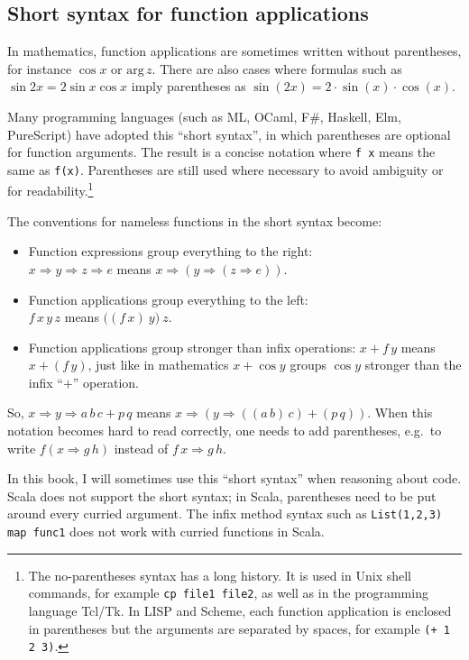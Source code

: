 \subsection{Short syntax for function applications}

In mathematics, function applications are sometimes written without
parentheses, for instance $\cos x$ or $\text{arg}\,z$. There are
also cases where formulas such as $\sin2x=2\sin x\cos x$ imply parentheses
as $\sin\left(2x\right)=2\cdot\sin\left(x\right)\cdot\cos\left(x\right)$.

Many programming languages (such as ML, OCaml, F\#, Haskell, Elm,
PureScript) have adopted this ``short syntax'', in which parentheses
are optional for function arguments. The result is a concise notation
where \lstinline!f x! means the same as \lstinline!f(x)!. Parentheses
are still used where necessary to avoid ambiguity or for readability.\footnote{The no-parentheses syntax has a long history. It is used in Unix shell
commands, for example \lstinline!cp file1 file2!, as well as in the
programming language Tcl/Tk. In LISP and Scheme, each function application
is enclosed in parentheses but the arguments are separated by spaces,
for example \lstinline!(+ 1 2 3)!.}

The conventions for nameless functions in the short syntax become:
\begin{itemize}
\item Function expressions group everything to the right:\\
 $x\Rightarrow y\Rightarrow z\Rightarrow e$ means $x\Rightarrow\left(y\Rightarrow\left(z\Rightarrow e\right)\right)$.
\item Function applications group everything to the left:\\
 $f\,x\,y\,z$ means $\big((f\,x)\:y\big)\:z$. 
\item Function applications group stronger than infix operations: $x+f\,y$
means $x+(f\,y)$, just like in mathematics $x+\cos y$ groups $\cos y$
stronger than the infix ``$+$'' operation.
\end{itemize}
So, $x\Rightarrow y\Rightarrow a\,b\,c+p\,q$ means $x\Rightarrow\left(y\Rightarrow\left(\left(a\,b\right)\,c\right)+(p\,q)\right)$.
When this notation becomes hard to read correctly, one needs to add
parentheses, e.g.\ to write $f(x\Rightarrow g\,h)$ instead of $f\,x\Rightarrow g\,h$.

In this book, I will sometimes use this ``short syntax'' when reasoning
about code. Scala does not support the short syntax; in Scala, parentheses
need to be put around every curried argument. The infix method syntax
such as \texttt{}\lstinline!List(1,2,3) map func1! does not work
with curried functions in Scala.

